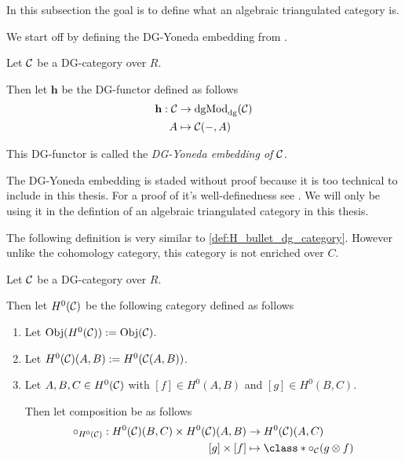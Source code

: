 In this subsection the goal is to define what an algebraic triangulated category is.

We start off by defining the DG-Yoneda embedding from \cite[Corollary 6.3.6]{Borceux_1994}.

\begin{definition}
    \label{def:DG_Yoneda_embedding}
    Let \( {\mathcal{C}} \) be a DG-category over \( R \).
    
    Then let \( \mathbf{h} \) be the DG-functor defined as follows
    \begin{align*}
        \mathbf{h}: {\mathcal{C}} &\to \operatorname{dgMod}_{\operatorname{dg}}({\mathcal{C}}) \\
        A &\mapsto {\mathcal{C}}(-, A)
    \end{align*}

    This DG-functor is called the \emph{DG-Yoneda embedding of \( {\mathcal{C}} \)}.
\end{definition}

The DG-Yoneda embedding is staded without proof because it is too technical to include in this thesis. For a proof of it's well-definedness see \cite[Corollary 6.3.6]{Borceux_1994}. We will only be using it in the defintion of an algebraic triangulated category in this thesis.


The following definition is very similar to \autoref{def:H_bullet_dg_category}. However unlike the cohomology category, this category is not enriched over \( C \).

\begin{definition}
    Let \( {\mathcal{C}} \) be a DG-category over \( R \).

    Then let \( H^0({\mathcal{C}}) \) be the following category defined as follows
    \begin{enumerate}
        \item {
            Let \( \operatorname{Obj}(H^0({\mathcal{C}})) := \operatorname{Obj}({\mathcal{C}}) \).
        }
        \item {
            Let \( H^0({\mathcal{C}})(A, B) := H^0({\mathcal{C}}(A, B)) \).
        }
        \item {
            Let \( A, B, C \in H^0({\mathcal{C}}) \) with \( [f] \in H^0(A, B) \) and \( [g] \in H^0(B, C) \).

            Then let composition be as follows
            \begin{align*}
                \circ_{H^0(\Cc)}: H^0(\Cc)(B, C) \times H^0(\Cc)(A, B) &\to H^0(\Cc)(A, C) \\
                [g] \times [f] &\mapsto \class*{ \circ_{\Cc}(g \otimes f) }
            \end{align*}
        }
    \end{enumerate}
\end{definition}

